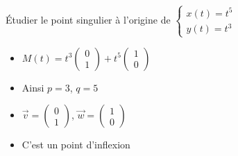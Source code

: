 \begin{frame}
\begin{exemple}
\'Etudier le point singulier à l'origine de 
$\left\{\begin{array}{l} x(t) = t^5\\ y(t) = t^3\end{array}\right.$

\pause
\begin{minipage}{0.45\textwidth}
\end{minipage}
\begin{minipage}{0.5\textwidth}

\begin{itemize}
  \pause\item $\displaystyle M(t) = t^3 \begin{pmatrix}0\\1\end{pmatrix} + t^5 
\begin{pmatrix}1\\0\end{pmatrix}$
  
  \pause\item Ainsi $p=3$, $q=5$
  
  \pause\item $\overrightarrow{v}=\left(\begin{smallmatrix}0\\1\end{smallmatrix}\right)$,
$\overrightarrow{w}=\left(\begin{smallmatrix}1\\0\end{smallmatrix}\right)$

  \pause\item C'est un point d'inflexion
\end{itemize}

\end{minipage}




\end{exemple}
	
\end{frame}

